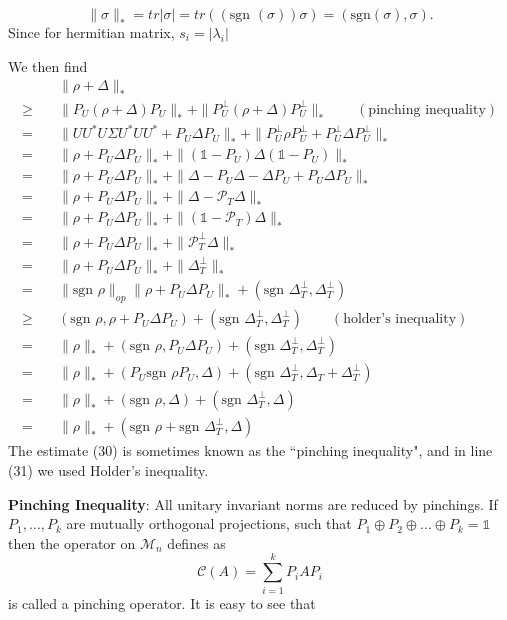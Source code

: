 \documentclass{article}
\begin{document}
\[
\|\sigma\|_* = tr|\sigma| = tr((\text{sgn }(\sigma))\sigma) = (\text{sgn}(\sigma),\sigma).
\]
Since for hermitian matrix, $s_i=|\lambda_i|$



We then find
\begin{align}
&\|\rho+\Delta\|_* \nonumber  \\
\ge\quad &\|P_U(\rho+\Delta)P_U\|_* + \|P_U^\perp(\rho+\Delta)P_U^\perp\|_*\qquad(\text{pinching inequality})\\
= \quad & \|UU^*U\Sigma U^*UU^*+P_U\Delta  P_U\|_* + \|P_U^\perp \rho P_U^\perp+P_U^\perp \Delta P_U^\perp\|_* \nonumber \\
= \quad & \|\rho + P_U\Delta P_U\|_* + \|(\mathbb{1}-P_U)\Delta(\mathbb{1}-P_U)\|_*\nonumber \\
= \quad & \|\rho + P_U\Delta P_U\|_* + \|\Delta-P_U\Delta-\Delta P_U + P_U\Delta P_U\|_*\nonumber \\
= \quad & \|\rho + P_U\Delta P_U\|_* + \|\Delta-\mathcal{P}_T\Delta\|_*\nonumber \\
= \quad & \|\rho + P_U\Delta P_U\|_* + \|(\mathbb{1}-\mathcal{P}_T)\Delta\|_*\nonumber \\
= \quad & \|\rho + P_U\Delta P_U\|_* + \|\mathcal{P}_T^\perp\Delta\|_*\nonumber \\
= \quad & \|\rho + P_U\Delta P_U\|_* + \|\Delta_T^\perp\|_* \nonumber \\
= \quad & \|\text{sgn }\rho\|_{op}\|\rho+P_U\Delta P_U\|_* + (\text{sgn }\Delta_T^\perp,\Delta_T^\perp)\nonumber\\
\ge \quad & (\text{sgn }\rho, \rho+P_U\Delta P_U)+(\text{sgn }\Delta_T^\perp, \Delta_T^\perp)\qquad(\text{holder's inequality})\\
= \quad & \|\rho\|_* + (\text{sgn }\rho,P_U\Delta P_U)+(\text{sgn }\Delta_T^\perp,\Delta_T^\perp)\nonumber \\
= \quad &\|\rho\|_* + (P_U\text{sgn }\rho P_U, \Delta) + (\text{sgn }\Delta_T^\perp, \Delta_T +\Delta_T^\perp)\nonumber\\
= \quad &\|\rho\|_* + (\text{sgn }\rho, \Delta) + (\text{sgn }\Delta_T^\perp,\Delta)\nonumber\\
= \quad &\|\rho\|_* + (\text{sgn }\rho+\text{sgn }\Delta_T^\perp,\Delta)
\end{align}
The estimate (30) is sometimes known as the ``pinching inequality", and in line (31) we used Holder's inequality.

\textbf{{\color{blue} Pinching Inequality}}: All unitary invariant norms are reduced by pinchings. If $P_1,\dots,P_k$ are mutually orthogonal projections, such that $P_1\oplus P_2 \oplus \dots \oplus P_k = \mathbb{1}$ then the operator on $\mathcal{M}_n$ defines as 
\begin{equation*}
\mathcal{C}(A) = \sum_{i=1}^k P_i A P_i
\end{equation*}
is called a pinching operator. It is easy to see that 
\end{document}
